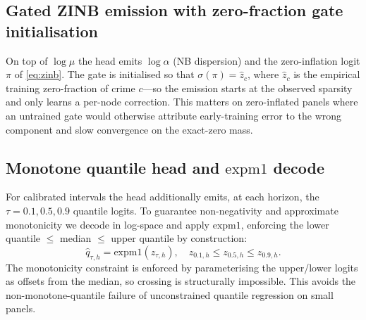 \documentclass[11pt,conference]{IEEEtran}
\begin{document}
\subsection{Gated ZINB emission with zero-fraction gate initialisation}\label{sec:gate}
On top of $\log\mu$ the head emits $\log\alpha$ (NB dispersion) and the
zero-inflation logit $\pi$ of \eqref{eq:zinb}. The gate is initialised so that
$\sigma(\pi)=\hat z_c$, where $\hat z_c$ is the empirical training zero-fraction
of crime $c$---so the emission starts at the observed sparsity and only learns a
per-node correction. This matters on zero-inflated panels where an untrained gate
would otherwise attribute early-training error to the wrong component and slow
convergence on the exact-zero mass.

\subsection{Monotone quantile head and $\mathrm{expm1}$ decode}\label{sec:quantile}
For calibrated intervals the head additionally emits, at each horizon, the
$\tau=0.1,0.5,0.9$ quantile logits. To guarantee non-negativity and approximate
monotonicity we decode in log-space and apply $\mathrm{expm1}$, enforcing the
lower quantile $\le$ median $\le$ upper quantile by construction:
\begin{equation}\label{eq:qdecode}
  \hat q_{\tau,h}=\mathrm{expm1}(z_{\tau,h}),\quad
  z_{0.1,h}\le z_{0.5,h}\le z_{0.9,h}.
\end{equation}
The monotonicity constraint is enforced by parameterising the upper/lower logits
as offsets from the median, so crossing is structurally impossible. This avoids
the non-monotone-quantile failure of unconstrained quantile regression on small
panels.
\end{document}
